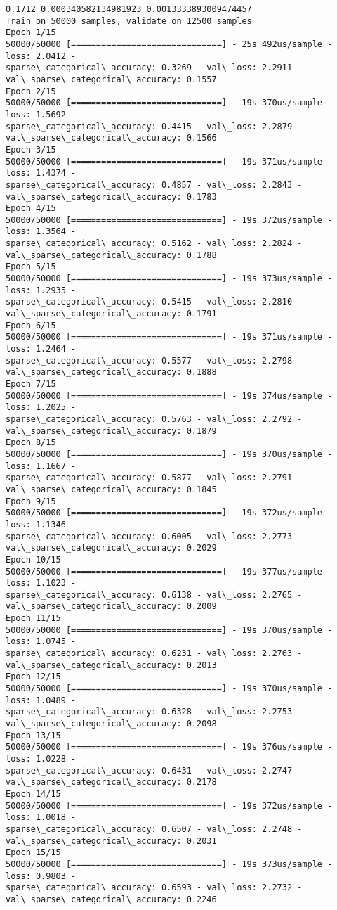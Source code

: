 \documentclass[11pt]{article}
\begin{document}
    \begin{Verbatim}[commandchars=\\\{\}]
0.1712 0.000340582134981923 0.0013333893009474457
Train on 50000 samples, validate on 12500 samples
Epoch 1/15
50000/50000 [==============================] - 25s 492us/sample - loss: 2.0412 -
sparse\_categorical\_accuracy: 0.3269 - val\_loss: 2.2911 -
val\_sparse\_categorical\_accuracy: 0.1557
Epoch 2/15
50000/50000 [==============================] - 19s 370us/sample - loss: 1.5692 -
sparse\_categorical\_accuracy: 0.4415 - val\_loss: 2.2879 -
val\_sparse\_categorical\_accuracy: 0.1566
Epoch 3/15
50000/50000 [==============================] - 19s 371us/sample - loss: 1.4374 -
sparse\_categorical\_accuracy: 0.4857 - val\_loss: 2.2843 -
val\_sparse\_categorical\_accuracy: 0.1783
Epoch 4/15
50000/50000 [==============================] - 19s 372us/sample - loss: 1.3564 -
sparse\_categorical\_accuracy: 0.5162 - val\_loss: 2.2824 -
val\_sparse\_categorical\_accuracy: 0.1788
Epoch 5/15
50000/50000 [==============================] - 19s 373us/sample - loss: 1.2935 -
sparse\_categorical\_accuracy: 0.5415 - val\_loss: 2.2810 -
val\_sparse\_categorical\_accuracy: 0.1791
Epoch 6/15
50000/50000 [==============================] - 19s 371us/sample - loss: 1.2464 -
sparse\_categorical\_accuracy: 0.5577 - val\_loss: 2.2798 -
val\_sparse\_categorical\_accuracy: 0.1888
Epoch 7/15
50000/50000 [==============================] - 19s 374us/sample - loss: 1.2025 -
sparse\_categorical\_accuracy: 0.5763 - val\_loss: 2.2792 -
val\_sparse\_categorical\_accuracy: 0.1879
Epoch 8/15
50000/50000 [==============================] - 19s 370us/sample - loss: 1.1667 -
sparse\_categorical\_accuracy: 0.5877 - val\_loss: 2.2791 -
val\_sparse\_categorical\_accuracy: 0.1845
Epoch 9/15
50000/50000 [==============================] - 19s 372us/sample - loss: 1.1346 -
sparse\_categorical\_accuracy: 0.6005 - val\_loss: 2.2773 -
val\_sparse\_categorical\_accuracy: 0.2029
Epoch 10/15
50000/50000 [==============================] - 19s 377us/sample - loss: 1.1023 -
sparse\_categorical\_accuracy: 0.6138 - val\_loss: 2.2765 -
val\_sparse\_categorical\_accuracy: 0.2009
Epoch 11/15
50000/50000 [==============================] - 19s 370us/sample - loss: 1.0745 -
sparse\_categorical\_accuracy: 0.6231 - val\_loss: 2.2763 -
val\_sparse\_categorical\_accuracy: 0.2013
Epoch 12/15
50000/50000 [==============================] - 19s 370us/sample - loss: 1.0489 -
sparse\_categorical\_accuracy: 0.6328 - val\_loss: 2.2753 -
val\_sparse\_categorical\_accuracy: 0.2098
Epoch 13/15
50000/50000 [==============================] - 19s 376us/sample - loss: 1.0228 -
sparse\_categorical\_accuracy: 0.6431 - val\_loss: 2.2747 -
val\_sparse\_categorical\_accuracy: 0.2178
Epoch 14/15
50000/50000 [==============================] - 19s 372us/sample - loss: 1.0018 -
sparse\_categorical\_accuracy: 0.6507 - val\_loss: 2.2748 -
val\_sparse\_categorical\_accuracy: 0.2031
Epoch 15/15
50000/50000 [==============================] - 19s 373us/sample - loss: 0.9803 -
sparse\_categorical\_accuracy: 0.6593 - val\_loss: 2.2732 -
val\_sparse\_categorical\_accuracy: 0.2246
    \end{Verbatim}
\end{document}
